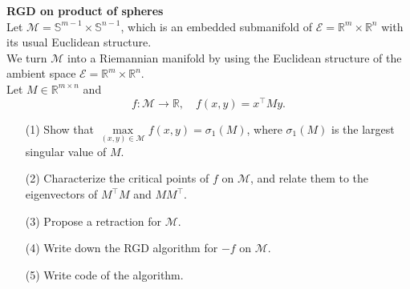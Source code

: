 \documentclass[en, oneside]{assignment}
\begin{document}
\begin{prob} \textbf{RGD on product of spheres}\\
    Let $\mathcal{M}  = \mathbb{S} ^{m-1} \times \mathbb{S} ^{n-1}$, 
    which is an embedded submanifold of $\mathcal{E} = \mathbb{R} ^m \times \mathbb{R} ^n$ with its usual Euclidean structure.\\
    We turn $\mathcal{M}$ into a Riemannian manifold by using the Euclidean structure of the ambient space $\mathcal{E} = \mathbb{R} ^m \times \mathbb{R} ^n$.\\
    Let $M \in \mathbb{R} ^{m \times n}$ and
    \begin{equation*}
        f: \mathcal{M} \to \mathbb{R}, \quad f(x, y) = x ^\top M y.
    \end{equation*}
    \begin{itemize}
        \item[(1)] Show that $\max\limits_{(x, y) \in \mathcal{M}} f(x, y) = \sigma _1 (M)$, where $\sigma _1 (M)$ is the largest singular value of $M$.
        \item[(2)] Characterize the critical points of $f$ on $\mathcal{M}$, and relate them to the eigenvectors of $M ^\top M$ and $MM ^\top$.
        \item[(3)] Propose a retraction for $\mathcal{M}$.
        \item[(4)] Write down the RGD algorithm for $-f$ on $\mathcal{M}$.
        \item[(5)] Write code of the algorithm.
    \end{itemize}
\end{prob}
\end{document}
